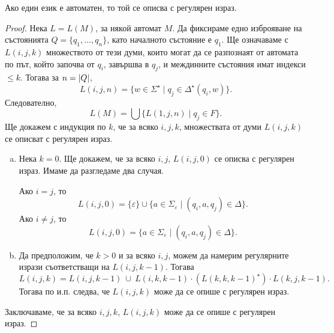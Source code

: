 \begin{lemma}
  Ако един език е автоматен, то той се описва с регулярен израз.
\end{lemma}
\begin{proof}
  Нека  $L = L(M)$, за някой автомат $M$.
  Да фиксираме едно изброяване на състоянията $Q = \{q_1,\dots,q_n\}$,
  като началното състояние е $q_1$.
  Ще означаваме с $L(i,j,k)$ множеството от тези думи, които
  могат да се разпознаят от автомата по път, който започва от $q_i$,
  завършва в $q_j$, и междинните състояния имат индекси $\leq k$.
  Тогава за $n = \vert{Q}\vert$, 
  \[L(i,j,n) = \{w\in\Sigma^\star\mid q_j\in \Delta^\star(q_i, w)\}.\]
  Следователно,
  \[L(M) = \bigcup\{L(1,j,n)\mid q_j \in F\}.\]
  Ще докажем с индукция по $k$, че за всяко $i,j,k$, множествата от думи $L(i,j,k)$
  се описват с регулярен израз.
  \begin{enumerate}[a)]
  \item
    Нека $k = 0$. Ще докажем, че за всяко $i,j$, $L(i,j,0)$ се описва с регулярен израз.
    Имаме да разгледаме два случая.
    
    Ако $i = j$, то 
    \[L(i, j, 0) = \{\varepsilon\}\cup\{a\in\Sigma_\varepsilon\mid (q_i, a, q_j) \in \Delta\}.\]
    Ако $i \neq j$, то
    \[L(i, j, 0) = \{a\in\Sigma_\varepsilon\mid (q_i, a, q_j) \in \Delta\}.\]
  \item
    Да предположим, че $k > 0$ и за всяко $i,j$, можем да намерим регулярните изрази
    съответстващи на $L(i,j,k-1)$. Тогава
    \[L(i,j,k) = L(i,j,k-1)\ \cup\ L(i,k,k-1)\cdot (L(k,k,k-1)^\star) \cdot L(k,j,k-1).\]
    Тогава по и.п. следва, че $L(i,j,k)$ може да се опише с регулярен израз.
  \end{enumerate}
  Заключаваме, че за всяко $i,j,k$, $L(i,j,k)$ може да се опише с регулярен израз.
\end{proof}

